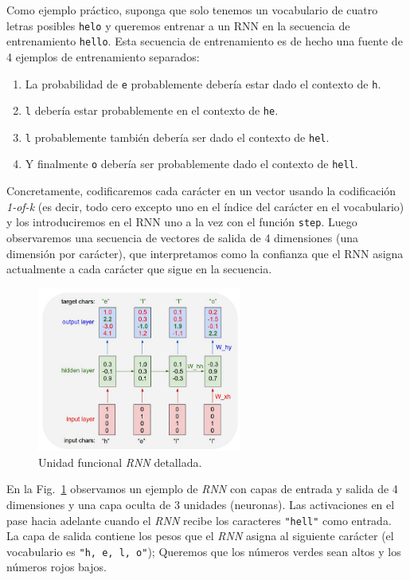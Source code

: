 \documentclass[a4paper,12pt]{article}
\begin{document}
Como ejemplo práctico, suponga que solo tenemos un vocabulario de cuatro letras posibles \texttt{helo} y queremos entrenar a un RNN en la secuencia de entrenamiento \texttt{hello}. Esta secuencia de entrenamiento es de hecho una fuente de 4 ejemplos de entrenamiento separados: 
\begin{enumerate}[noitemsep, topsep=2pt]
	\item La probabilidad de \texttt{e} probablemente debería estar dado el contexto de \texttt{h}.
	\item \texttt{l} debería estar probablemente en el contexto de \texttt{he}.
	\item \texttt{l} probablemente también debería ser dado el contexto de \texttt{hel}.
	\item  Y finalmente \texttt{o} debería ser probablemente dado el contexto de \texttt{hell}.
\end{enumerate}

Concretamente, codificaremos cada carácter en un vector usando la codificación \textit{1-of-k} (es decir, todo cero excepto uno en el índice del carácter en el vocabulario) y los introduciremos en el RNN uno a la vez con el función \texttt{step}. Luego observaremos una secuencia de vectores de salida de 4 dimensiones (una dimensión por carácter), que interpretamos como la confianza que el RNN asigna actualmente a cada carácter que sigue en la secuencia. 

\begin{figure}[H]
	\begin{center}				
	\includegraphics[width=0.6\textwidth]{tesis_29.png}
  	\caption{Unidad funcional \textit{RNN} detallada.}
  	\label{fig:rnnexample}
  	\end{center}
\end{figure}

En la Fig.~\ref{fig:rnnexample} observamos un ejemplo de \textit{RNN} con capas de entrada y salida de 4 dimensiones y una capa oculta de 3 unidades (neuronas). Las activaciones en el pase hacia adelante cuando el \textit{RNN} recibe los caracteres \texttt{"hell"} como entrada. La capa de salida contiene los pesos que el \textit{RNN} asigna al siguiente carácter (el vocabulario es \texttt{"h, e, l, o"}); Queremos que los números verdes sean altos y los números rojos bajos.
\end{document}
